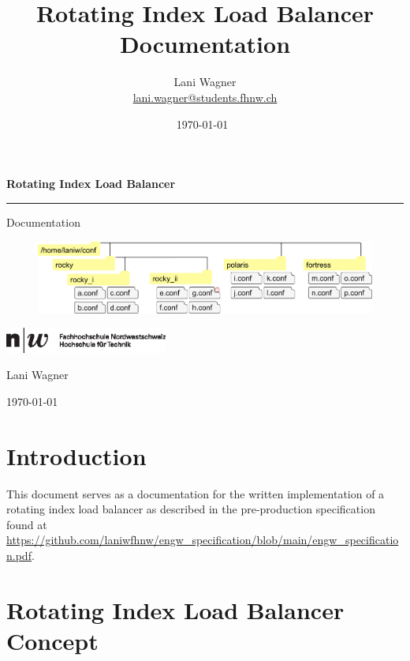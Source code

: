 \documentclass[11pt]{article} %
\title{Rotating Index Load Balancer Documentation}
\author{Lani Wagner\\\href{mailto:lani.wagner@students.fhnw.ch}{lani.wagner@students.fhnw.ch}}
\date{\today\ \currenttime} %
\newcommand{\rilb}{Rotating Index Load Balancer }
\begin{document}
  \begin{titlepage}
    \begin{center}
      \vspace*{1cm}

      \textbf{\Huge \rilb}

      \vspace{1.5cm}
      \hrule
      \vspace{1cm}

      {\Large Documentation}

      \vspace{2.5cm}


      \begin{figure}[H]
        \centering
        \includegraphics[width=.9\linewidth, keepaspectratio]{res/rilb_visualization}
        \label{fig:rilb-vis-title}
      \end{figure}

      \vfill

      \includegraphics[width=0.4\textwidth]{res/fhnw_ht_10mm}

      \vspace{0.8cm}

      Lani Wagner

      \today\ \currenttime

    \end{center}
  \end{titlepage}

  \section*{Introduction}

  This document serves as a documentation for the written implementation of a rotating index load balancer as described in the pre-production specification found at \url{https://github.com/laniwfhnw/engw_specification/blob/main/engw_specification.pdf}.

    {\hypersetup{hidelinks} \tableofcontents}
  \newpage



  \section{\rilb Concept}\label{sec:2}
\end{document}
